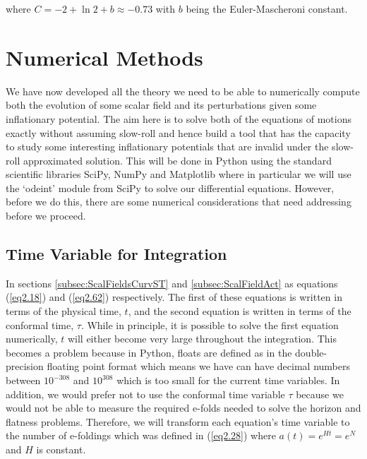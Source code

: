 \documentclass[a4paper,12pt,twoside]{report}
\begin{document}
where $C = -2 + \ln 2 + b \approx -0.73$ with $b$ being the Euler-Mascheroni constant.


\chapter{Numerical Methods}
\label{chap:NumMeths}

We have now developed all the theory we need to be able to numerically compute both the evolution of some scalar field and its perturbations given some inflationary potential. The aim here is to solve both of the equations of motions exactly without assuming slow-roll and hence build a tool that has the capacity to study some interesting inflationary potentials that are invalid under the slow-roll approximated solution. This will be done in Python using the standard scientific libraries SciPy, NumPy and Matplotlib \cite{Scipy, oliphant2006guide, hunter2007matplotlib} where in particular we will use the `odeint' module from SciPy to solve our differential equations. However, before we do this, there are some numerical considerations that need addressing before we proceed.

\section{Time Variable for Integration} \label{sec:TimeVarInt}

In sections \ref{subsec:ScalFieldsCurvST} and \ref{subsec:ScalFieldAct} as equations (\ref{eq2.18}) and (\ref{eq2.62}) respectively. The first of these equations is written in terms of the physical time, $t$, and the second equation is written in terms of the conformal time, $\tau$. While in principle, it is possible to solve the first equation numerically, $t$ will either become very large throughout the integration. This becomes a problem because in Python, floats are defined as in the double-precision floating point format which means we have can have decimal numbers between $10^{-308}$ and $10^{308}$ which is too small for the current time variables. In addition, we would prefer not to use the conformal time variable $\tau$ because we would not be able to measure the required e-folds needed to solve the horizon and flatness problems. Therefore, we will transform each equation's time variable to the number of e-foldings which was defined in (\ref{eq2.28}) where $a(t) = e^{Ht} = e^{N}$ and $H$ is constant.
\end{document}
